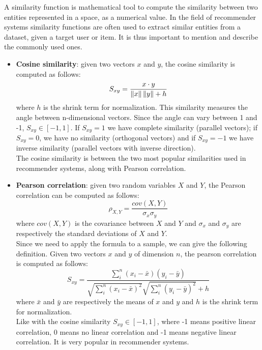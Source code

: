 A similarity function is mathematical tool to compute the similarity between two entities represented in a space, as a numerical value. In the field of recommender systems similarity functions are often used to extract similar entities from a dataset, given a target user or item. It is thus important to mention and describe the commonly used ones.
\begin{itemize}
\item \textbf{Cosine similarity}: given two vectors $x$ and $y$, the cosine similarity is computed as follows:
\begin{equation*}
S_{xy} = \frac{x \cdot y}{\left\lVert x\right\rVert \left\lVert y\right\rVert + h}
\end{equation*}
where $h$ is the shrink term for normalization.
This similarity measures the angle between n-dimensional vectors. Since the angle can vary between 1 and -1, $S_{xy} \in [-1, 1]$. If $S_{xy} = 1$ we have complete similarity (parallel vectors); if $S_{xy} = 0$, we have no similarity (orthogonal vectors) and if $S_{xy} = -1$ we have inverse similarity (parallel vectors with inverse direction).\\
The cosine similarity is between the two most popular similarities used in recommender systems, along with Pearson correlation.
\item \textbf{Pearson correlation}: given two random variables $X$ and $Y$, the Pearson correlation can be computed as follows:
\begin{equation*}
\rho_{X,Y} = \frac{cov(X,Y)}{\sigma_x \sigma_y}
\end{equation*}
where $cov(X,Y)$ is the covariance between $X$ and $Y$ and $\sigma_x$ and $\sigma_y$ are respectively the standard deviations of $X$ and $Y$.\\
Since we need to apply the formula to a sample, we can give the following definition. Given two vectors $x$ and $y$ of dimension $n$, the pearson correlation is computed as follows:
\begin{equation*}
S_{xy} = \frac{\sum_{i}^{n} (x_i - \bar{x})(y_i - \bar{y})}{\sqrt{\sum_{i}^{n} (x_i - \bar{x})^2}\sqrt{\sum_{i}^{n} (y_i - \bar{y})^2} + h}
\end{equation*}
where $\bar{x}$ and $\bar{y}$ are respectively the means of $x$ and $y$ and $h$ is the shrink term for normalization.\\
Like with the cosine similarity $S_{xy} \in [-1, 1]$, where -1 means positive linear correlation, 0 means no linear correlation and -1 means negative linear correlation. It is very popular in recommender systems.

\end{itemize}

